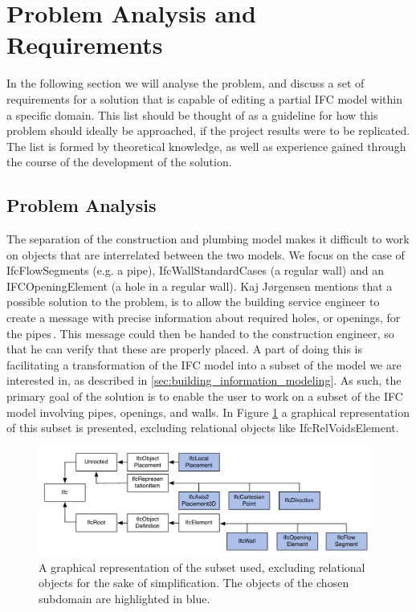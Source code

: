 \section{Problem Analysis and Requirements}
\label{sec:problem_analysis_and_requirements}
In the following section we will analyse the problem, and discuss a set of requirements for a solution that is capable of editing a partial IFC model within a specific domain. This list should be thought of as a guideline for how this problem should ideally be approached, if the project results were to be replicated. The list is formed by theoretical knowledge, as well as experience gained through the course of the development of the solution.

\subsection{Problem Analysis}
\label{subsec:problem_analysis}
The separation of the construction and plumbing model makes it difficult to work on objects that are interrelated between the two models. We focus on the case of IfcFlowSegments (e.g. a pipe), IfcWallStandardCases (a regular wall) and an IFCOpeningElement (a hole in a regular wall). Kaj Jørgensen mentions that a possible solution to the problem, is to allow the building service engineer to create a message with precise information about required holes, or openings, for the pipes\,\cite{jorgensen12}. This message could then be handed to the construction engineer, so that he can verify that these are properly placed. A part of doing this is facilitating a transformation of the IFC model into a subset of the model we are interested in, as described in \ref{sec:building_information_modeling}. As such, the primary goal of the solution is to enable the user to work on a subset of the IFC model involving pipes, openings, and walls. In Figure \ref{fig:ifcheirachy} a graphical representation of this subset is presented, excluding relational objects like IfcRelVoidsElement.

\begin{figure}[t]
    \centering
        \includegraphics[width=110mm]{images/IfcHeirachy.pdf}
    \caption{A graphical representation of the subset used, excluding relational objects for the sake of simplification. The objects of the chosen subdomain are highlighted in blue.}
    \label{fig:ifcheirachy}
\end{figure}

